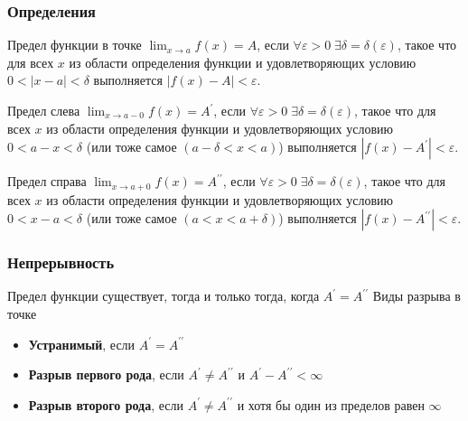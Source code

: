 \documentclass[10pt]{beamer}
\numberwithin{equation}{subsection}
\begin{document}
    \begin{frame}[fragile]
        \frametitle{Определения}
        \begin{block}{Предел функции в точке}
            \footnotesize
            $\displaystyle\lim_{x \rightarrow a} f(x) = A$, если $\forall \varepsilon>0 \; \exists \delta = \delta(\varepsilon)$, 
            такое что для всех $x$ из области определения функции и удовлетворяющих условию $0<|x-a|<\delta$ выполняется
            $|f(x)-A| < \varepsilon$.
        \end{block}
        \begin{block}{Предел слева}
            \footnotesize
            $\displaystyle\lim_{x \rightarrow a-0} f(x) = A^\prime$, если $\forall \varepsilon>0 \; \exists \delta = \delta(\varepsilon)$, 
            такое что для всех $x$ из области определения функции и удовлетворяющих условию $0<a-x<\delta$ (или тоже самое $(a-\delta<x<a)$) выполняется
            $|f(x)-A^\prime| < \varepsilon$.
        \end{block}
        \begin{block}{Предел справа}
            \footnotesize
            $\displaystyle\lim_{x \rightarrow a+0} f(x) = A^{\prime\prime}$, если $\forall \varepsilon>0 \; \exists \delta = \delta(\varepsilon)$, 
            такое что для всех $x$ из области определения функции и удовлетворяющих условию $0<x-a<\delta$ (или тоже самое $(a<x<a+\delta)$) выполняется
            $|f(x)-A^{\prime\prime}| < \varepsilon$.
        \end{block}
    \end{frame}

    \begin{frame}
        \frametitle{Непрерывность}
        Предел функции существует, тогда и только тогда, когда $A^\prime = A^{\prime\prime}$
        Виды разрыва в точке
        \begin{itemize}
            \item \textbf{Устранимый}, если $A^\prime = A^{\prime\prime}$
            \item \textbf{Разрыв первого рода}, если $A^\prime \neq  A^{\prime\prime}$ и $A^\prime - A^{\prime\prime} < \infty$
            \item \textbf{Разрыв второго рода}, если $A^\prime \neq  A^{\prime\prime}$ и хотя бы один из пределов равен $\infty$
        \end{itemize}
    \end{frame}
\end{document}
